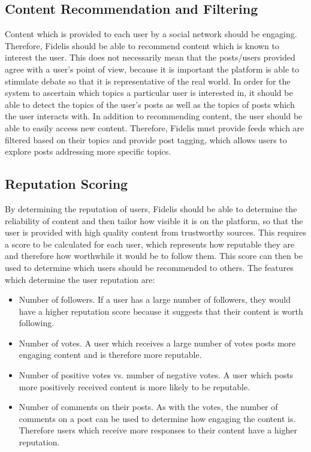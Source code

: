 \subsection{Content Recommendation and Filtering}
Content which is provided to each user by a social network should be engaging. Therefore, Fidelis should be able to recommend content which is known to interest the user. This does not necessarily mean that the posts/users provided agree with a user's point of view, because it is important the platform is able to stimulate debate so that it is representative of the real world. In order for the system to ascertain which topics a particular user is interested in, it should be able to detect the topics of the user's posts as well as the topics of posts which the user interacts with. In addition to recommending content, the user should be able to easily access new content. Therefore, Fidelis must provide feeds which are filtered based on their topics and provide post tagging, which allows users to explore posts addressing more specific topics.

\subsection{Reputation Scoring}
By determining the reputation of users, Fidelis should be able to determine the reliability of content and then tailor how visible it is on the platform, so that the user is provided with high quality content from trustworthy sources. This requires a score to be calculated for each user, which represents how reputable they are and therefore how worthwhile it would be to follow them. This score can then be used to determine which users should be recommended to others. The features which determine the user reputation are:

\begin{itemize}
\item Number of followers. If a user has a large number of followers, they would have a higher reputation score because it suggests that their content is worth following.
\item Number of votes. A user which receives a large number of votes posts more engaging content and is therefore more reputable.
\item Number of positive votes vs. number of negative votes. A user which posts more positively received content is more likely to be reputable.
\item Number of comments on their posts. As with the votes, the number of comments on a post can be used to determine how engaging the content is. Therefore users which receive more responses to their content have a higher reputation.
\end{itemize}


